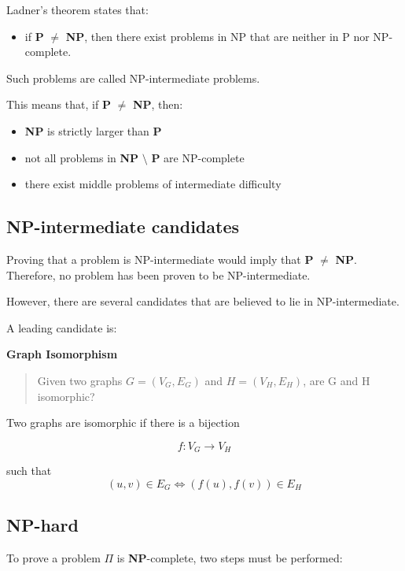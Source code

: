 \documentclass[11pt]{article}
\providecommand{\tightlist}{%
      \setlength{\itemsep}{0pt}\setlength{\parskip}{0pt}}
\begin{document}
Ladner's theorem states that:

\begin{itemize}
\tightlist
\item
  if \textbf{P} \(\neq\) \textbf{NP}, then there exist problems in NP
  that are neither in P nor NP-complete.
\end{itemize}

Such problems are called NP-intermediate problems.

This means that, if \textbf{P} \(\neq\) \textbf{NP}, then:

\begin{itemize}
\tightlist
\item
  \textbf{NP} is strictly larger than \textbf{P}
\item
  not all problems in \textbf{NP} \(\setminus\) \textbf{P} are
  NP-complete
\item
  there exist middle problems of intermediate difficulty
\end{itemize}

    \subsection{NP-intermediate
candidates}\label{np-intermediate-candidates}

Proving that a problem is NP-intermediate would imply that \textbf{P}
\(\neq\) \textbf{NP}. Therefore, no problem has been proven to be
NP-intermediate.

However, there are several candidates that are believed to lie in
NP-intermediate.

A leading candidate is:

\textbf{Graph Isomorphism}

\begin{quote}
Given two graphs \(G = (V_G, E_G)\) and \(H = (V_H, E_H)\), are G and H
isomorphic?
\end{quote}

Two graphs are isomorphic if there is a bijection

\[f: V_G \to V_H \]

such that \[ 
(u,v) \in E_G \iff (f(u),f(v)) \in E_H
\]

    \subsection{NP-hard}\label{np-hard}

To prove a problem \(\Pi\) is \textbf{NP}-complete, two steps must be
performed:
\end{document}
